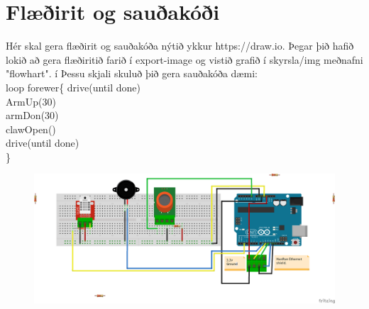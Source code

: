 \section{Flæðirit og sauðakóði}Hér skal gera flæðirit og sauðakóða nýtið ykkur https://draw.io. Þegar þið hafið lokið að gera flæðiritið farið í export-image og vistið grafið í skyrsla/img meðnafni "flowhart". í Þessu skjali skuluð þið gera sauðakóða 
dæmi:\\
loop forewer\{
  drive(until done)\\
  ArmUp(30)\\
  armDon(30)\\
  clawOpen()\\
  drive(until done)\\
\}
\begin{figure}[h]
\includegraphics[scale=.3]{img/project}
\end{figure}
